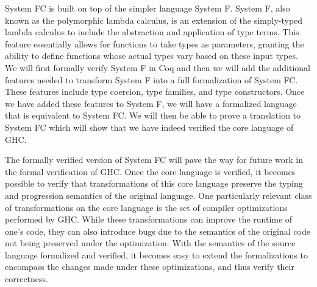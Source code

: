 \documentclass{sig-alternate}
\begin{document}
System FC is built on top of the simpler language System F.  System F, also known as the polymorphic lambda calculus, is an extension of the simply-typed lambda calculus to include the abstraction and application of type terms. This feature essentially allows for functions to take types as parameters, granting the ability to define functions whose actual types vary based on these input types. We will first formally verify System F in Coq and then we will add the additional features needed to transform System F into a full formalization of System FC.  These features include type coercion, type families, and type constructors.  Once we have added these features to System F, we will have a formalized language that is equivalent to System FC.  We will then be able to prove a translation to System FC which will show that we have indeed verified the core language of GHC.

The formally verified version of System FC will pave the way for future work in the formal verification of GHC. Once the core language is verified, it becomes possible to verify that transformations of this core language preserve the typing and progression semantics of the original language.  One particularly relevant class of transformations on the core language is the set of compiler optimizations performed by GHC. While these transformations can improve the runtime of one’s code, they can also introduce bugs due to the semantics of the original code not being preserved under the optimization. With the semantics of the source language formalized and verified, it becomes easy to extend the formalizations to encompass the changes made under these optimizations, and thus verify their correctness. 
\end{document}
